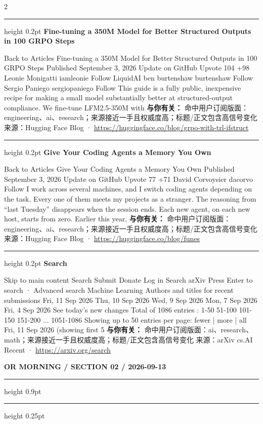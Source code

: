 \documentclass[10.5pt]{ctexart}
\begin{document}
\begin{multicols}{2}
\vspace{2mm}
\hrule height 0.2pt
\vspace{2mm}
{\large\bfseries Fine-tuning a 350M Model for Better Structured Outputs in 100 GRPO Steps}\par
Back to Articles Fine-tuning a 350M Model for Better Structured Outputs in 100 GRPO Steps Published September 3, 2026 Update on GitHub Upvote 104 +98 Leonie Monigatti iamleonie Follow LiquidAI ben burtenshaw burtenshaw Follow Sergio Paniego sergiopaniego Follow This guide is a fully public, inexpensive recipe for making a small model substantially better at structured-output compliance. We fine-tune LFM2.5-350M with 
\textbf{与你有关：} 命中用户订阅版面：engineering、ai、research；来源接近一手且权威度高；标题/正文包含高信号变化
{\footnotesize\color{ormuted} 来源：Hugging Face Blog · \url{https://huggingface.co/blog/grpo-with-trl-ifstruct}}
\vspace{2mm}
\hrule height 0.2pt
\vspace{2mm}
{\large\bfseries Give Your Coding Agents a Memory You Own}\par
Back to Articles Give Your Coding Agents a Memory You Own Published September 3, 2026 Update on GitHub Upvote 77 +71 David Corvoysier dacorvo Follow I work across several machines, and I switch coding agents depending on the task. Every one of them meets my projects as a stranger. The reasoning from “last Tuesday” disappears when the session ends. Each new agent, on each new host, starts from zero. Earlier this year,
\textbf{与你有关：} 命中用户订阅版面：engineering、ai、research；来源接近一手且权威度高；标题/正文包含高信号变化
{\footnotesize\color{ormuted} 来源：Hugging Face Blog · \url{https://huggingface.co/blog/funes}}
\vspace{2mm}
\hrule height 0.2pt
\vspace{2mm}
{\large\bfseries Search}\par
Skip to main content Search Submit Donate Log in Search arXiv Press Enter to search · Advanced search Machine Learning Authors and titles for recent submissions Fri, 11 Sep 2026 Thu, 10 Sep 2026 Wed, 9 Sep 2026 Mon, 7 Sep 2026 Fri, 4 Sep 2026 See today's new changes Total of 1086 entries : 1-50 51-100 101-150 151-200 ... 1051-1086 Showing up to 50 entries per page: fewer | more | all Fri, 11 Sep 2026 (showing first 5
\textbf{与你有关：} 命中用户订阅版面：ai、research、math；来源接近一手且权威度高；标题/正文包含高信号变化
{\footnotesize\color{ormuted} 来源：arXiv cs.AI Recent · \url{https://arxiv.org/search}}
\end{multicols}
\newpage
{\small\bfseries OR MORNING / SECTION 02 / 2026-09-13}
\vspace{2mm}
\hrule height 0.9pt
\vspace{1.5mm}
\hrule height 0.25pt
\vspace{4mm}
\end{document}

